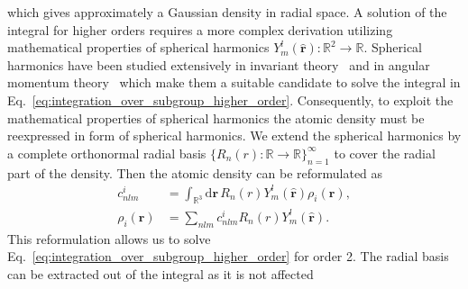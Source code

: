 which gives approximately a Gaussian density in radial space.
A solution of the integral for higher orders requires a more complex derivation utilizing mathematical properties of spherical harmonics $Y_m^l(\hat{\mathbf{r}}):\mathbb{R}^2\rightarrow\mathbb{R}$. %
Spherical harmonics have been studied extensively in invariant theory~\cite{dowker2008spherical} and in angular momentum theory~\cite{yutsis1965theory} which make them a suitable candidate to solve the integral in Eq.~\eqref{eq:integration_over_subgroup_higher_order}.
Consequently, to exploit the mathematical properties of spherical harmonics the atomic density must be reexpressed in form of spherical harmonics.
We extend the spherical harmonics by a complete orthonormal radial basis $\{R_n(r) :\mathbb{R}\rightarrow\mathbb{R}\}_{n=1}^\infty$ to cover the radial part of the density.
Then the atomic density can be reformulated as
\begin{subequations}
\begin{align}
  c^i_{nlm} &= \int_{\mathbb{R}^3}\mathrm{d}\mathbf{r}\, R_n(r)Y^l_m(\hat{\mathbf{r}})\rho_i(\mathbf{r}), \\
  \rho_i(\mathbf{r}) &= \sum_{nlm} c^i_{nlm}R_n(r)Y^l_m(\hat{\mathbf{r}}).
  \label{eq:radial_angular_density}
\end{align}
\end{subequations}
This reformulation allows us to solve Eq.~\eqref{eq:integration_over_subgroup_higher_order} for order 2.
The radial basis can be extracted out of the integral as it is not affected 
